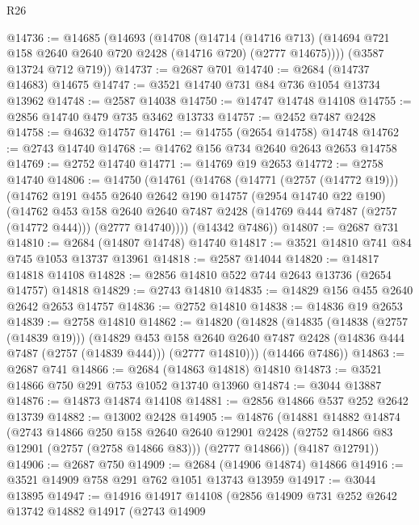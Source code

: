 \begin{lexlean}{R26}
\begin{coremodule}
@14736 := @14685
    (@14693
      (@14708
        (@14714
          (@14716 @713)
          (@14694 @721 @158 @2640 @2640 @720 @2428 (@14716 @720) (@2777 @14675))))
      (@3587 @13724 @712 @719))
@14737 := @2687 @701
@14740 := @2684 (@14737 @14683) @14675
@14747 := @3521 @14740 @731 @84 @736 @1054 @13734 @13962
@14748 := @2587 @14038
@14750 := @14747 @14748 @14108
@14755 := @2856 @14740 @479 @735 @3462 @13733
@14757 := @2452 @7487 @2428
@14758 := @4632 @14757
@14761 := @14755 (@2654 @14758) @14748
@14762 := @2743 @14740
@14768 := @14762 @156 @734 @2640 @2643 @2653 @14758
@14769 := @2752 @14740
@14771 := @14769 @19 @2653
@14772 := @2758 @14740
@14806 := @14750
    (@14761
      (@14768
        (@14771 (@2757 (@14772 @19)))
        (@14762
          @191
          @455
          @2640
          @2642
          @190
          @14757
          (@2954 @14740 @22 @190)
          (@14762
            @453
            @158
            @2640
            @2640
            @7487
            @2428
            (@14769 @444 @7487 (@2757 (@14772 @444)))
            (@2777 @14740))))
      (@14342 @7486))
@14807 := @2687 @731
@14810 := @2684 (@14807 @14748) @14740
@14817 := @3521 @14810 @741 @84 @745 @1053 @13737 @13961
@14818 := @2587 @14044
@14820 := @14817 @14818 @14108
@14828 := @2856 @14810 @522 @744 @2643 @13736 (@2654 @14757) @14818
@14829 := @2743 @14810
@14835 := @14829 @156 @455 @2640 @2642 @2653 @14757
@14836 := @2752 @14810
@14838 := @14836 @19 @2653
@14839 := @2758 @14810
@14862 := @14820
    (@14828
      (@14835
        (@14838 (@2757 (@14839 @19)))
        (@14829
          @453
          @158
          @2640
          @2640
          @7487
          @2428
          (@14836 @444 @7487 (@2757 (@14839 @444)))
          (@2777 @14810)))
      (@14466 @7486))
@14863 := @2687 @741
@14866 := @2684 (@14863 @14818) @14810
@14873 := @3521 @14866 @750 @291 @753 @1052 @13740 @13960
@14874 := @3044 @13887
@14876 := @14873 @14874 @14108
@14881 := @2856 @14866 @537 @252 @2642 @13739
@14882 := @13002 @2428
@14905 := @14876
    (@14881
      @14882
      @14874
      (@2743
        @14866
        @250
        @158
        @2640
        @2640
        @12901
        @2428
        (@2752 @14866 @83 @12901 (@2757 (@2758 @14866 @83)))
        (@2777 @14866))
      (@4187 @12791))
@14906 := @2687 @750
@14909 := @2684 (@14906 @14874) @14866
@14916 := @3521 @14909 @758 @291 @762 @1051 @13743 @13959
@14917 := @3044 @13895
@14947 := @14916
    @14917
    @14108
    (@2856
      @14909
      @731
      @252
      @2642
      @13742
      @14882
      @14917
      (@2743
        @14909

\end{coremodule}
\end{lexlean}
